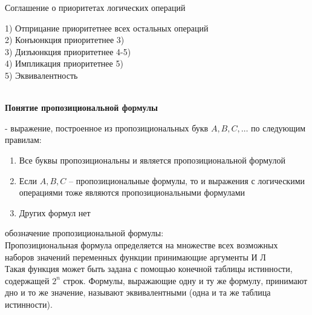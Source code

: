 \documentclass[a4paper, 12pt]{report}
\begin{document}
\begin{center}
Соглашение о приоритетах логических операций
\end{center}
1)	Отприцание приоритетнее всех остальных операций\\
2)	Конъюнкция приоритетнее 3)\\
3)	Дизъюнкция приоритетнее 4-5)\\
4)	Импликация приоритетнее 5)\\
5)	Эквивалентность\\\\
\begin{center}
	\textbf{Понятие пропозициональной формулы }
\end{center}    
- выражение, построенное из пропозициональных букв $ A, B, C, \dotso $ по следующим правилам:
\begin{enumerate}
	\item Все буквы пропозициональны и является пропозициональной формулой
\item  Если $ A, B, C $ – пропозициональные формулы, то и выражения с логическими операциями тоже являются пропозициональными формулами
\item Других формул нет 
\end{enumerate}
обозначение пропозициональной формулы: \\
Пропозициональная формула определяется на множестве всех возможных наборов значений переменных функции принимающие аргументы И Л\\
Такая функция может быть задана с помощью конечной таблицы истинности, содержащей $2^n$ строк.
Формулы, выражающие одну и ту же формулу, принимают дно и то же значение, называют эквивалентными (одна и та же таблица истинности).
\end{document}
